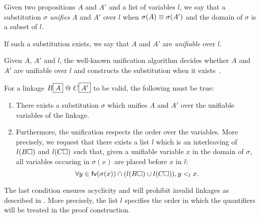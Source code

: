 \begin{definition}[Unification] Given two propositions $A$ and $A'$ and a list of variables
  $l$, we say that a substitution $\sigma$ \emph{unifies} $A$ and $A'$ over $l$
  when $\sigma(A)\equiv\sigma(A')$ and the domain of $\sigma$ is a subset of $l$. 

  If such a substitution exists, we say that $A$ and $A'$ are \emph{unifiable}
  over $l$.
\end{definition}
Given $A$, $A'$ and $l$, the well-known unification algorithm decides
whether $A$ and $A'$ are unifiable over $l$ and constructs the
substitution when it exists~.

\begin{condition}[Identity]\label{cond:unif} 
  For a linkage $B\fbox{$A$}\operatorname{\,@\,} C\fbox{$A'$}$ to be valid, the following must
  be true:
  \begin{enumerate}
   \item There exists a substitution $\sigma$ which unifies $A$ and
     $A'$ over the unifiable variables of the linkage.\label{clause:unif}
   \item \label{lab:cond} Furthermore, the unification respects the order over
     the variables. More precisely, we request that there exists a list $l$
     which is an interleaving of $l(B\square)$ and $l(C\square)$ such
     that, given a unifiable variable $x$ in the domain of $\sigma$, all
     variables occuring in $\sigma(x)$ are placed before $x$ in $l$:
     $$\forall y\in\mathsf{fv}(\sigma(x))\cap(l(B\square)\cup l(C\square)), y <_l
     x.$$\label{clause:deps}
  \end{enumerate}
\end{condition}

The last condition ensures acyclicity and will prohibit invalid
linkages as described in . More precisely,
the list $l$ specifies the order in which the quantifiers will be
treated in the proof construction.



